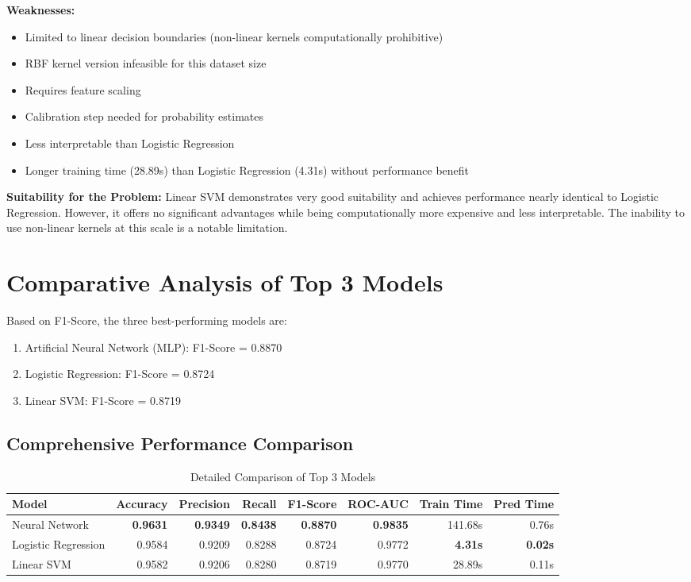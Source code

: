 \documentclass[sigconf]{acmart}
\begin{document}
\textbf{Weaknesses:}
\begin{itemize}
    \item Limited to linear decision boundaries (non-linear kernels computationally prohibitive)
    \item RBF kernel version infeasible for this dataset size
    \item Requires feature scaling
    \item Calibration step needed for probability estimates
    \item Less interpretable than Logistic Regression
    \item Longer training time (28.89s) than Logistic Regression (4.31s) without performance benefit
\end{itemize}

\textbf{Suitability for the Problem:} Linear SVM demonstrates very good suitability and achieves performance nearly identical to Logistic Regression. However, it offers no significant advantages while being computationally more expensive and less interpretable. The inability to use non-linear kernels at this scale is a notable limitation.

\section{Comparative Analysis of Top 3 Models}

Based on F1-Score, the three best-performing models are:
\begin{enumerate}
    \item Artificial Neural Network (MLP): F1-Score = 0.8870
    \item Logistic Regression: F1-Score = 0.8724
    \item Linear SVM: F1-Score = 0.8719
\end{enumerate}

\subsection{Comprehensive Performance Comparison}

\begin{table}[t]
\centering
\caption{Detailed Comparison of Top 3 Models}
\begin{tabular}{lrrrrrrr}
\toprule
Model & Accuracy & Precision & Recall & F1-Score & ROC-AUC & Train Time & Pred Time \\
\midrule
Neural Network & \textbf{0.9631} & \textbf{0.9349} & \textbf{0.8438} & \textbf{0.8870} & \textbf{0.9835} & 141.68s & 0.76s \\
Logistic Regression & 0.9584 & 0.9209 & 0.8288 & 0.8724 & 0.9772 & \textbf{4.31s} & \textbf{0.02s} \\
Linear SVM & 0.9582 & 0.9206 & 0.8280 & 0.8719 & 0.9770 & 28.89s & 0.11s \\
\bottomrule
\end{tabular}
\end{table}
\end{document}
